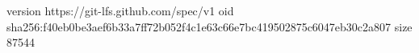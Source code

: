 version https://git-lfs.github.com/spec/v1
oid sha256:f40eb0be3aef6b33a7ff72b052f4c1e63c66e7bc419502875c6047eb30c2a807
size 87544
